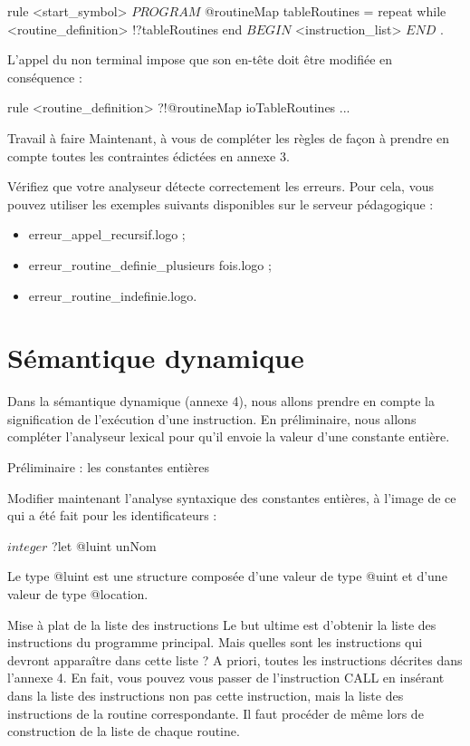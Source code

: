 \begin{galgascode}
rule <start_symbol> {
  $PROGRAM$
  @routineMap tableRoutines = {}
  repeat
  while 
    <routine_definition> !?tableRoutines
  end
  $BEGIN$
  <instruction_list>
  $END$
  $.$
}
\end{galgascode}

L'appel du non terminal impose que son en-tête doit être modifiée en conséquence :
\begin{galgascode}
rule <routine_definition> ?!@routineMap ioTableRoutines {
  ...
}
\end{galgascode}

Travail à faire
Maintenant, à vous de compléter les règles de façon à prendre en compte toutes les contraintes édictées en annexe 3.

Vérifiez que votre analyseur détecte correctement les erreurs. Pour cela, vous pouvez utiliser les exemples suivants disponibles sur le serveur pédagogique :
\begin{itemize}
  \item erreur\_appel\_recursif.logo ;
  \item erreur\_routine\_definie\_plusieurs fois.logo ;
  \item erreur\_routine\_indefinie.logo.
\end{itemize}

\section{Sémantique dynamique}

Dans la sémantique dynamique (annexe 4), nous allons prendre en compte la signification de l'exécution d'une instruction. En préliminaire, nous allons compléter l'analyseur lexical pour qu'il envoie la valeur d'une constante entière.

Préliminaire : les constantes entières

Modifier maintenant l’analyse syntaxique des constantes entières, à l’image de ce qui a été fait pour les identificateurs :
\begin{galgascode}
$integer$ ?let @luint unNom
\end{galgascode}

Le type @luint est une structure composée d’une valeur de type @uint et d’une valeur de type @location.

Mise à plat de la liste des instructions
Le but ultime est d'obtenir la liste des instructions du programme principal. Mais quelles sont les instructions qui devront apparaître dans cette liste ? A priori, toutes les instructions décrites dans l'annexe 4. En fait, vous pouvez vous passer de l'instruction CALL en insérant dans la liste des instructions non pas cette instruction, mais la liste des instructions de la routine correspondante. Il faut procéder de même lors de construction de la liste de chaque routine.

